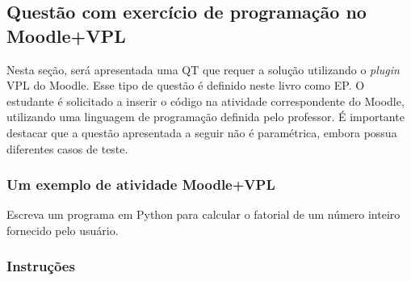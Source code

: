 \subsection{Questão com exercício de programação no Moodle+VPL}

Nesta seção, será apresentada uma QT que requer a solução utilizando o \textit{
plugin} VPL do Moodle. Esse tipo de questão é definido neste livro como EP. O estudante é solicitado a inserir o código na atividade correspondente do Moodle, utilizando uma linguagem de programação definida pelo professor. É importante destacar que a questão apresentada a seguir não é paramétrica, embora possua diferentes casos de teste.

\subsubsection{Um exemplo de atividade Moodle+VPL}

Escreva um programa em Python para calcular o fatorial de um número inteiro fornecido pelo usuário.

\subsubsection{Instruções}

